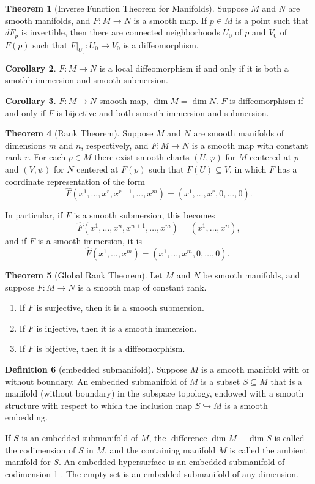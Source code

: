 \documentclass[12pt,a4paper]{book}
\newenvironment{enu}{\begin{enumerate}[(1)]}{\end{enumerate}}
\theoremstyle{definition}
\newtheorem{defn}{Definition}[section]
\newtheorem{coro}[defn]{Corollary}
\newtheorem{theo}[defn]{Theorem}
\begin{document}
\begin{theo}[Inverse Function Theorem for Manifolds]
    Suppose $M$ and $N$ are smooth manifolds, and $F: M \rightarrow N$ is a smooth map. If $p \in M$ is a point such that $d F_p$ is invertible, then there are connected neighborhoods $U_0$ of $p$ and $V_0$ of $F(p)$ such that $\left.F\right|_{U_0}: U_0 \rightarrow V_0$ is a diffeomorphism.
\end{theo}
\begin{coro}
    $F:M\rightarrow N$ is a local diffeomorphism if and only if it is both a smothh immersion and smooth submersion.
\end{coro}
\begin{coro}
    $F:M\rightarrow N$ smooth map, $\dim M=\dim N$. $F$ is diffeomorphism if and only if
    $F$ is bijective and both smooth immersion and submersion.
\end{coro}
\begin{theo}[Rank Theorem]
    Suppose $M$ and $N$ are smooth manifolds of dimensions $m$ and $n$, respectively, and $F: M \rightarrow N$ is a smooth map with constant rank $r$. For each $p \in M$ there exist smooth charts $(U, \varphi)$ for $M$ centered at $p$ and $(V, \psi)$ for $N$ centered at $F(p)$ such that $F(U) \subseteq V$, in which $F$ has a coordinate representation of the form
    $$
        \hat{F}\left(x^1, \ldots, x^r, x^{r+1}, \ldots, x^m\right)=\left(x^1, \ldots, x^r, 0, \ldots, 0\right) .
    $$

    In particular, if $F$ is a smooth submersion, this becomes
    $$
        \widehat{F}\left(x^1, \ldots, x^n, x^{n+1}, \ldots, x^m\right)=\left(x^1, \ldots, x^n\right),
    $$
    and if $F$ is a smooth immersion, it is
    $$
        \hat{F}\left(x^1, \ldots, x^m\right)=\left(x^1, \ldots, x^m, 0, \ldots, 0\right) \text {. }
    $$
\end{theo}
\begin{theo}[Global Rank Theorem]
    Let $M$ and $N$ be smooth manifolds, and suppose $F: M \rightarrow N$ is a smooth map of constant rank.
    \begin{enu}
        \item If $F$ is surjective, then it is a smooth submersion.
        \item If $F$ is injective, then it is a smooth immersion.
        \item If $F$ is bijective, then it is a diffeomorphism.
    \end{enu}
\end{theo}
\begin{defn}[embedded submanifold]
    Suppose $M$ is a smooth manifold with or without boundary. An embedded submanifold of $M$ is a subset $S \subseteq M$ that is a manifold (without boundary) in the subspace topology, endowed with a smooth structure with respect to which the inclusion map
    $S \hookrightarrow M$ is a smooth embedding.

    If $S$ is an embedded submanifold of $M$, the $\operatorname{difference} \operatorname{dim} M-\operatorname{dim} S$ is called the codimension of $S$ in $M$, and the containing manifold $M$ is called the ambient manifold for $S$. An embedded hypersurface is an embedded submanifold of codimension 1 . The empty set is an embedded submanifold of any dimension.
\end{defn}
\end{document}
